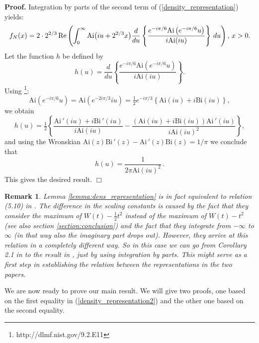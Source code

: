 \documentclass[11pt]{article}
\newtheorem{remark}{Remark}[section]
\begin{document}
\noindent
{\bf Proof.} Integration by parts of the second term of (\ref{density_representation}) yields:
$$
f_N(x)=2\cdot2^{2/3}\,\mbox{\rm Re}\left(\int_0^{\infty}{\mbox{Ai}}\bigl(iu+2^{2/3}x\bigr)\frac{d}{du}\left\{\frac{e^{-i\pi/6}{\mbox{Ai}}\left(e^{-i\pi/6}u\right)}{i{\mbox{Ai}}(iu)}\right\}\,du\right),\,x>0.
$$
Let the function $h$ be defined by
$$
h(u)=\frac{d}{du}\left\{\frac{e^{-i\pi/6}{\mbox{Ai}}\left(e^{-i\pi/6}u\right)}{i{\mbox{Ai}}(iu)}\right\}.
$$
Using  {{\small \sc {}}}\footnote{http://dlmf.nist.gov/9.2.E11}:
$$
{\mbox{Ai}}\left(e^{-i\pi/6}u\right)={\mbox{Ai}}\left(e^{-2i\pi/3}iu\right)=\tfrac12e^{-i\pi/3}\left\{{\mbox{Ai}}(iu)+i{\mbox{Bi}}(iu)\right\},
$$
we obtain
$$
h(u)=\tfrac12\left\{\frac{{\mbox{Ai}}\,'(iu)+i{\mbox{Bi}}\,'(iu)}{i{\mbox{Ai}}(iu)}
-\frac{\left({\mbox{Ai}}(iu)+i{\mbox{Bi}}(iu)\right){\mbox{Ai}}\,'(iu)}{i{\mbox{Ai}}(iu)^2}\right\},
$$
and using the Wronskian ${\mbox{Ai}}(z){\mbox{Bi}}\,'(z)-{\mbox{Ai}}\,'(z){\mbox{Bi}}(z)=1/\pi$ we conclude that
$$
h(u)=\frac{1}{2\pi{\mbox{Ai}}(iu)^2}\,.
$$
This gives the desired result.
{\hfill\mbox{$\Box$}\newline}

\begin{remark}
{\rm Lemma \ref{lemma:dens_representation} is in fact equivalent to relation (5.10) in {{\small \sc {}}}. The difference in the scaling constants is caused by the fact that they consider the maximum of $W(t)-\tfrac12t^2$ instead of the maximum of $W(t)-t^2$ (see also section \ref{section:conclusion}) and the fact that they integrate from $-\infty$ to $\infty$ (in that way also the imaginary part drops out). However, they arrive at this relation in a completely different way. So in this case we can go from Corollary 2.1 in {{\small \sc {}}} to the result in {{\small \sc {}}}, just by using integration by parts. This might serve as a first step in establishing the relation between the representations in the two papers.
}
\end{remark}

We are now ready to prove our main result. We will give two proofs, one based on the first equality in (\ref{density_representation2}) and the other one based on the second equality.
\end{document}
